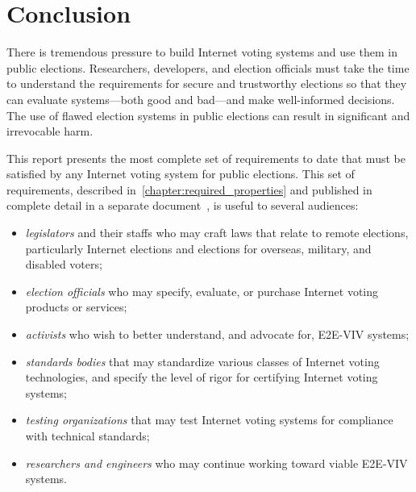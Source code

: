 \chapter{Conclusion}
\label{chapter:conclusion}

There is tremendous pressure to build Internet voting systems and use
them in public elections. Researchers, developers, and election
officials must take the time to understand the requirements for secure
and trustworthy elections so that they can evaluate systems---both
good and bad---and make well-informed decisions.  The use of flawed
election systems in public elections can result in significant and
irrevocable harm.

This report presents the most complete set of requirements to date
that must be satisfied by any Internet voting system for public
elections. This set of requirements, described
in~\autoref{chapter:required_properties} and published in complete
detail in a separate document~\cite{E2EVIVBON}, is useful to
several audiences:
\begin{itemize}
\item \emph{legislators} and their staffs who may craft laws that
  relate to remote elections, particularly Internet elections and
  elections for overseas, military, and disabled voters;
\item \emph{election officials} who may specify, evaluate, or
  purchase Internet voting products or services;
\item \emph{activists} who wish to better understand, and advocate
  for, E2E-VIV systems;
\item \emph{standards bodies} that may standardize various classes of
  Internet voting technologies, and specify the level of rigor for
  certifying Internet voting systems;
\item \emph{testing organizations} that may test Internet voting
  systems for compliance with technical standards;
\item \emph{researchers and engineers} who may continue working
  toward viable E2E-VIV systems.
\end{itemize}

